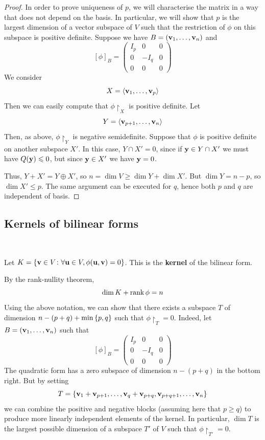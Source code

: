\documentclass[a4paper,11pt]{article}
\begin{document}
\begin{proof}
	In order to prove uniqueness of \( p \), we will characterise the matrix in a way that does not depend on the basis.
	In particular, we will show that \( p \) is the largest dimension of a vector subspace of \( V \) such that the restriction of \( \phi \) on this subspace is positive definite.
	Suppose we have \( B = ({\bf v}_1, \dots, {\bf v}_n) \) and
	\[
		[\phi]_B = \begin{pmatrix}
			I_p & 0    & 0 \\
			0   & -I_q & 0 \\
			0   & 0    & 0
		\end{pmatrix}
	\]
	We consider
	\[
		X = \left\langle{} {\bf v}_1, \dots, {\bf v}_p \right\rangle
	\]
	Then we can easily compute that \({\phi}\restriction_X \) is positive definite.
	Let
	\[
		Y = \left\langle{} {\bf v}_{p+1}, \dots, {\bf v}_n \right\rangle
	\]
	Then, as above, \( {\phi}\restriction_Y \) is negative semidefinite.
	Suppose that \( \phi \) is positive definite on another subspace \( X' \).
	In this case, \( Y \cap X' = \qty{0} \), since if \( {\bf y} \in Y \cap X' \) we must have \( Q({\bf y}) \leqslant 0 \), but since \( {\bf y} \in X' \) we have \( {\bf y} = 0 \).

	Thus, \( Y + X' = Y \oplus X' \), so \( n = \dim V \geq \dim Y + \dim X' \).
	But \( \dim Y = n - p \), so \( \dim X' \leq p \).
	The same argument can be executed for \( q \), hence both \( p \) and \( q \) are independent of basis.
\end{proof}

\subsection{Kernels of bilinear forms}
\ \vspace*{-1.5em}
\begin{definition}
	Let \( K = \qty{ {\bf v}\in V \colon \forall {\bf u}\in V, \phi({\bf u},{\bf v}) = 0 } \).
	This is the \textbf{kernel} of the bilinear form.
\end{definition}
\begin{remark}
	By the rank-nullity theorem,
	\[
		\dim K + \rank \phi = n
	\]
	Using the above notation, we can show that there exists a subspace \( T \) of dimension \( n - (p+q) + \min\qty{p,q} \) such that \( {\phi}\restriction_T = 0 \).
	Indeed, let \( B = ({\bf v}_1, \dots, {\bf v}_n) \) such that
	\[
		[\phi]_B = \begin{pmatrix}
			I_p & 0    & 0 \\
			0   & -I_q & 0 \\
			0   & 0    & 0
		\end{pmatrix}
	\]
	The quadratic form has a zero subspace of dimension \( n - (p+q) \) in the bottom right.
	But by setting
	\[
		T = \qty{{\bf v}_1 + {\bf v}_{p+1}, \dots, {\bf v}_q + {\bf v}_{p+q}, {\bf v}_{p+q+1}, \dots, {\bf v}_n}
	\]
	we can combine the positive and negative blocks (assuming here that \( p \geq q \)) to produce more linearly independent elements of the kernel.
	In particular, \( \dim T \) is the largest possible dimension of a subspace \( T' \) of \( V \) such that \( {\phi}\restriction_{T'} = 0 \).
\end{remark}
\end{document}
